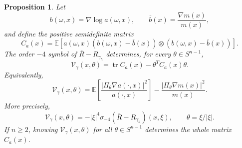 \documentclass[10pt,a4paper]{amsart}
\newtheorem{proposition}{Proposition}
\newcommand{\E}{\mathbb E}
\newcommand{\tr}{\operatorname{tr}}
\begin{document}
\begin{proposition}\label{prop:conductivity-first-invariant}
Let
\[
  b(\omega,x)=\nabla\log a(\omega,x),
  \qquad
  \overline b(x)=\frac{\nabla m(x)}{m(x)},
\]
and define the positive semidefinite matrix
\begin{equation}\label{eq:conductivity-covariance-matrix}
  C_a(x)=\E\left[a(\omega,x)
  (b(\omega,x)-\overline b(x))\otimes
  (b(\omega,x)-\overline b(x))\right].
\end{equation}
The order $-4$ symbol of $\overline R-R_{\gamma_h}$ determines, for every $\theta\in S^{n-1}$,
\begin{equation}\label{eq:conductivity-invariant}
  \mathcal V_\gamma(x,\theta)
  =\tr C_a(x)-\theta^TC_a(x)\theta.
\end{equation}
Equivalently,
\[
  \mathcal V_\gamma(x,\theta)
  =\E\left[\frac{|\Pi_\theta\nabla a(\cdot,x)|^2}{a(\cdot,x)}\right]
  -\frac{|\Pi_\theta\nabla m(x)|^2}{m(x)}.
\]
More precisely,
\[
  \mathcal V_\gamma(x,\theta)
  =- |\xi|^4\sigma_{-4}(\overline R-R_{\gamma_h})(x,\xi),
  \qquad \theta=\xi/|\xi|.
\]
If $n\ge2$, knowing $\mathcal V_\gamma(x,\theta)$ for all $\theta\in S^{n-1}$ determines the whole matrix $C_a(x)$.
\end{proposition}
\end{document}
